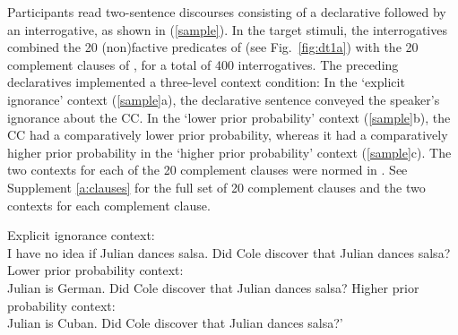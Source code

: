 \documentclass[11pt,fleqn]{article}
\newcommand{\6}{\mbox{$[\hspace*{-.6mm}[$}}
\newcommand{\9}{\mbox{$]\hspace*{-.6mm}]$}}
\begin{document}
Participants read two-sentence discourses consisting of a declarative followed by an interrogative, as shown in (\ref{sample}). In the target stimuli, the interrogatives combined the 20 (non)factive predicates of \citealt{degen-tonhauser-language} (see Fig.~\ref{fig:dt1a}) with the 20 complement clauses of \citealt{degen-tonhauser-language}, for a total of 400 interrogatives. The preceding declaratives implemented a three-level context condition: In the `explicit ignorance' context (\ref{sample}a), the declarative sentence conveyed the speaker's ignorance about the CC. In the `lower prior probability' context (\ref{sample}b), the CC had a comparatively lower prior probability, whereas it had a comparatively higher prior probability in the `higher prior probability' context (\ref{sample}c). The two contexts for each of the 20 complement clauses were normed in \citealt{degen-tonhauser-openmind}. See Supplement \ref{a:clauses} for the full set of 20 complement clauses and the two contexts for each complement clause.

\begin{exe}
\ex\label{sample}
\begin{xlist}
\ex Explicit ignorance context: \\ I have no idea if Julian dances salsa. Did Cole discover that Julian dances salsa?
\ex Lower prior probability context: \\ Julian is German. Did Cole discover that Julian dances salsa?
\ex Higher prior probability context: \\ Julian is Cuban. Did Cole discover that Julian dances salsa?'
\end{xlist}
\end{exe}
\end{document}
